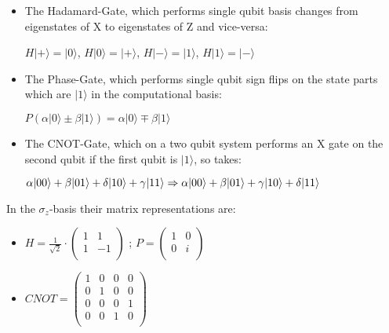 \begin{itemize}
    \item The Hadamard-Gate, which performs single qubit
    basis changes from eigenstates of X to eigenstates of Z 
    and vice-versa:

    $H|+\rangle = |0\rangle$, $H|0\rangle = |+\rangle$,
    $H|-\rangle = |1\rangle$, $H|1\rangle = |-\rangle$
    
    \item The Phase-Gate, which performs single qubit sign
    flips on the state parts which are $|1\rangle$ in the 
    computational basis:

    $
    P (\alpha|0\rangle \pm \beta |1\rangle) =
    \alpha|0\rangle \mp \beta |1\rangle
    $

    \item The CNOT-Gate, which on a two qubit system performs 
    an X gate on the second qubit if the first qubit is 
    $|1\rangle$, so takes:

    $
    \alpha |00\rangle + \beta |01\rangle + 
    \delta |10\rangle + \gamma |11\rangle \\
    \Rightarrow
    \alpha |00\rangle + \beta |01\rangle +
    \gamma |10\rangle + \delta |11\rangle
    $
\end{itemize}
In the $\sigma_z$-basis their matrix representations are:
\begin{itemize}
    \item
    \begin{math}
    H = 
    \frac{1}{\sqrt{2}}\cdot\left( 
    \begin{array}{cc}
       1 & 1 \\
       1 & -1 \\
    \end{array}
    \right)\end{math} 
;
    \begin{math}
    P = 
    \left(\begin{array}{cc}
        1 & 0 \\
        0 & i \\
    \end{array}\right)
    \end{math}
    
    \item 
    \begin{math}
    CNOT = 
    \left(\begin{array}{cccc}
        1 & 0 & 0 & 0 \\
        0 & 1 & 0 & 0 \\
        0 & 0 & 0 & 1 \\
        0 & 0 & 1 & 0 \\
    \end{array}\right)
   \end{math} 
\end{itemize}
